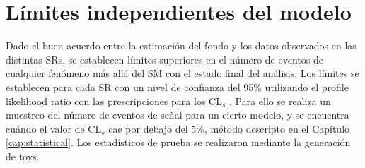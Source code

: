 \begin{table}[ht!]
\begin{tabular}{lccc}
      \bottomrule
      \bottomrule
    \end{tabular}
\label{tab:syst_rel_impact}
\end{table}




\section{Límites independientes del modelo}


Dado el buen acuerdo entre la estimación del fondo y los datos observados en las distintas SRs, se establecen límites superiores en el número de eventos de cualquier fenómeno más allá del SM con el estado final del análisis. Los límites se establecen para cada SR con un nivel de confianza del 95\% utilizando el profile likelihood ratio con las prescripciones para los $\text{CL}_{s}$ \cite{Read:2002hq}. Para ello se realiza un muestreo del número de eventos de señal para un cierto modelo, y se encuentra cuándo el valor de $\text{CL}_{s}$ cae por debajo del 5\%, método descripto en el Capítulo \ref{cap:statistical}. Los estadísticos de prueba se realizaron mediante la generación de  toys.

